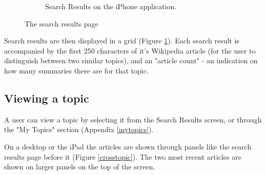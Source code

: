 \documentclass[12pt]{article}
\begin{document}
\begin{appendices}
\begin{figure}[ht!]
\begin{subfigure}[t]{0.3\textwidth}
   \caption{Search Results on the iPhone application.}
   \end{subfigure}
   \caption{The search results page}
   \label{crosssearching}
\end{figure}

Search results are then displayed in a grid (Figure \ref{crosssearching}). Each search result is accompanied by the first 250 characters of it's Wikipedia article (for the user to distinguish between two similar topics), and an "article count" - an indication on how many summaries there are for that topic.

\subsection{Viewing a topic}

A user can view a topic by selecting it from the Search Results screen, or through the "My Topics" section (Appendix \ref{mytopics}).

On a desktop or the iPad the articles are shown through panels like the search results page before it (Figure \ref{crosstopic}). The two most recent articles are shown on larger panels on the top of the screen. 


\end{appendices}
\end{document}

